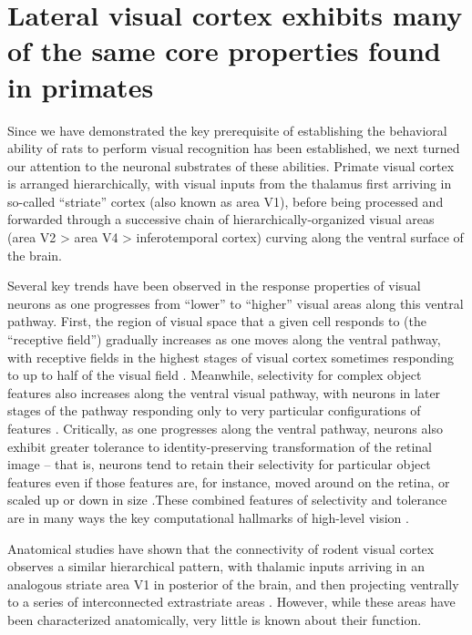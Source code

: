 \section{Lateral visual cortex exhibits many of the same core properties found in primates}

Since we have demonstrated the key prerequisite of establishing the behavioral ability of rats to perform visual recognition has been established, we next turned our attention to the neuronal substrates of these abilities.  Primate visual cortex is arranged hierarchically, with visual inputs from the thalamus first arriving in so-called ``striate'' cortex (also known as area V1), before being processed and forwarded through a successive chain of hierarchically-organized visual areas (area V2 > area V4 > inferotemporal cortex) curving along the ventral surface of the brain.  

Several key trends have been observed in the response properties of visual neurons as one progresses from ``lower'' to ``higher'' visual areas along this ventral pathway. First, the region of visual space that a given cell responds to (the ``receptive field'') gradually increases as one moves along the ventral pathway, with receptive fields in the highest stages of visual cortex sometimes responding to up to half of the visual field \cite{op2000spatial}. Meanwhile, selectivity for complex object features also increases along the ventral visual pathway, with neurons in later stages of the pathway responding only to very particular configurations of features \cite{Desimone1984, Logothetis1996}.  Critically, as one progresses along the ventral pathway, neurons also exhibit greater tolerance to identity-preserving transformation of the retinal image -- that is, neurons tend to retain their selectivity for particular object features even if those features are, for instance, moved around on the retina, or scaled up or down in size \cite{Ito1995}.These combined features of selectivity and tolerance are in many ways the key computational hallmarks of high-level vision \cite{DiCarlo2007, DiCarlo2012}. 

Anatomical studies have shown that the connectivity of rodent visual cortex observes a similar hierarchical pattern, with thalamic inputs arriving in an analogous striate area V1 in posterior of the brain, and then projecting ventrally to a series of interconnected extrastriate areas  \cite{Coogan1993, ETC}.  However, while these areas have been characterized anatomically, very little is known about their function.

